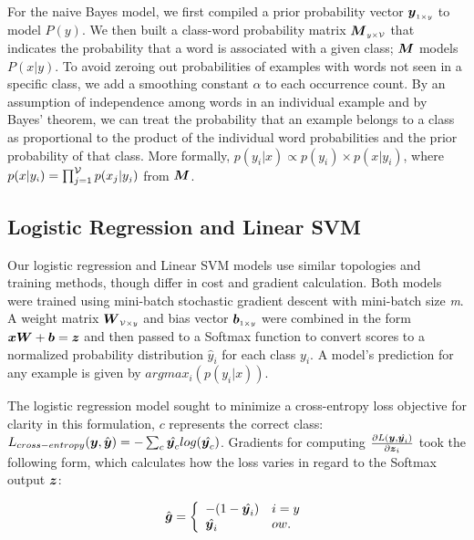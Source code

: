 \documentclass[11pt]{article}
\begin{document}
For the naive Bayes model, we first compiled a prior probability vector $\boldsymbol{y}_{\scriptscriptstyle 1\times y}$ to model $P(y)$. We then built a class-word probability matrix $\boldsymbol{M}_{\scriptscriptstyle y\times \mathcal{V}}$ that indicates the probability that a word is associated with a given class; $\boldsymbol{M}$ models $P(x|y)$. To avoid zeroing out probabilities of examples with words not seen in a specific class, we add a smoothing constant $\alpha$ to each occurrence count. By an assumption of independence among words in an individual example and by Bayes' theorem, we can treat the probability that an example belongs to a class as proportional to the product of the individual word probabilities and the prior probability of that class. More formally, $p(y_{\scriptscriptstyle i}|x) \propto  p(y_{\scriptscriptstyle i}) \times p(x|y_{\scriptscriptstyle i})$, where $p(x|y_{\scriptscriptstyle i}) = \prod_{j=1}^{\mathcal{V}} p(x_{j}|y_{\scriptscriptstyle j})$ from $\boldsymbol{M}$.

\subsection{Logistic Regression and Linear SVM}

Our logistic regression and Linear SVM models use similar topologies and training methods, though differ in cost and gradient calculation. Both models were trained using mini-batch stochastic gradient descent with mini-batch size \textit{m}. A weight matrix $\boldsymbol{W}_{\scriptscriptstyle \mathcal{V}\times y}$ and bias vector $\boldsymbol{b}_{\scriptscriptstyle 1\times y}$ were combined in the form $\boldsymbol{x}\boldsymbol{W} + \boldsymbol{b} = \boldsymbol{z}$ and then passed to a Softmax function to convert scores to a normalized probability distribution $\hat{y}_i$ for each class $y_i$. A model's prediction for any example is given by $argmax_i(p(y_i|x))$.

The logistic regression model sought to minimize a cross-entropy loss objective for clarity in this formulation, $c$ represents the correct class: $L_{cross-entropy}(\boldsymbol{y}, \hat{\boldsymbol{y}}) = -\sum_{c} \hat{\boldsymbol{y}_c} log(\hat{\boldsymbol{y}_c})$. Gradients for computing $\frac{\partial L(\boldsymbol{y}, \hat{\boldsymbol{y}_i})}{\partial \boldsymbol{z}_i}$ took the following form, which calculates how the loss varies in regard to the Softmax output $\boldsymbol{z}$:

\[\hat{\boldsymbol{g}} = \left\{
\begin{array}{ll}
      -(1 - \hat{\boldsymbol{y}_i}) & i = y \\
      \hat{\boldsymbol{y}_i} & ow. \\
\end{array}
\right. \]
\end{document}
